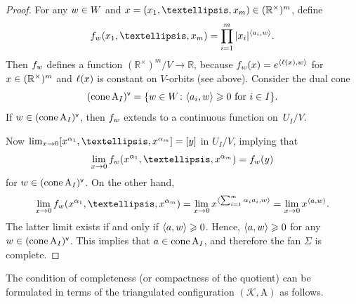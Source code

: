 \documentclass[a4paper]{amsart}
\theoremstyle{definition}
\theoremstyle{remark}
\numberwithin{equation}{section}
\def\R{\mathbb R}
\def\R{\mathbb R}
\newcommand{\mb}[1]{{\textbf {\textit#1}}}
\renewcommand{\ge}{\geqslant}
\def\cone{\mathop{\mathrm{cone}}}
\newcommand{\<}{\langle}
\renewcommand{\>}{\rangle}
\begin{document}
\begin{proof}
For any $\mb w\in W$ and $\mb x= (x_1,\ldots,x_m)\in (\R^\times)^m$, define
\[
  f_{\mb w}(x_1,\ldots,x_m)=\prod_{i=1}^m|x_i|^{\langle\mb a_i,\mb w\rangle}.
\]
Then $f_{\mb w}$ defines a function $(\R^\times)^m/V\to\R$, because $f_{\mb w}(\mb x)=e^{\langle\ell(\mb x),\mb w\rangle}$ for $\mb x\in(\R^\times)^m$ and $\ell(\mb x)$ is constant on $V$-orbits (see above). Consider the dual cone
\[
  (\cone \mathrm A_I)^\mathsf{v}=
  \{\mb w\in W\colon\langle\mb a_i,\mb w\rangle\ge 0\text{ for }i\in I\}.
\]
If $\mb w\in(\cone \mathrm A_I)^\mathsf{v}$, then $f_{\mb w}$ extends to a continuous  function on~$U_I/V$.

Now $\lim_{x\to0}[x^{\alpha_1},\ldots,x^{\alpha_m}]=[\mb y]$ in $U_I/V$, implying that 
\[
  \lim_{x\to0}f_{\mb w}(x^{\alpha_1},\ldots,x^{\alpha_m})=f_{\mb w}(\mb y)
\]  
 for $\mb w\in(\cone \mathrm A_I)^\mathsf{v}$. On the other hand,
\[
  \lim_{x\to0}f_{\mb w}(x^{\alpha_1},\ldots,x^{\alpha_m})  
  =\lim_{x\to 0} x^{\langle\sum_{i=1}^m\alpha_i\mb a_i,\mb w\rangle}
  =\lim_{x\to 0} x^{\langle\mb a,\mb w\rangle}.
\]
The latter limit exists if and only if $\langle\mb a,\mb w\rangle\ge0$. Hence, $\langle\mb a,\mb w\rangle\ge0$ for any $\mb w\in(\cone \mathrm A_I)^\mathsf{v}$. This implies  that $\mb a\in\cone \mathrm A_I$, and therefore the fan $\Sigma$ is complete.
\end{proof}

The condition of completeness (or compactness of the quotient) can be formulated in terms of the triangulated configuration $(\mathcal K,\mathrm A)$ as follows.
\end{document}
